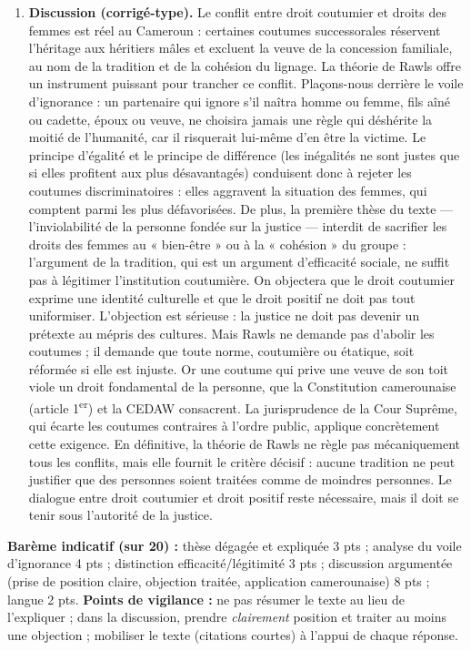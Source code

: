 \documentclass[11pt]{article}
\begin{document}
\begin{corrige}
\begin{enumerate}
\item \textbf{Discussion (corrigé-type).} Le conflit entre droit coutumier et droits des femmes est réel au Cameroun : certaines coutumes successorales réservent l'héritage aux héritiers mâles et excluent la veuve de la concession familiale, au nom de la tradition et de la cohésion du lignage. La théorie de Rawls offre un instrument puissant pour trancher ce conflit. Plaçons-nous derrière le voile d'ignorance : un partenaire qui ignore s'il naîtra homme ou femme, fils aîné ou cadette, époux ou veuve, ne choisira jamais une règle qui déshérite la moitié de l'humanité, car il risquerait lui-même d'en être la victime. Le principe d'égalité et le principe de différence (les inégalités ne sont justes que si elles profitent aux plus désavantagés) conduisent donc à rejeter les coutumes discriminatoires : elles aggravent la situation des femmes, qui comptent parmi les plus défavorisées. De plus, la première thèse du texte — l'inviolabilité de la personne fondée sur la justice — interdit de sacrifier les droits des femmes au « bien-être » ou à la « cohésion » du groupe : l'argument de la tradition, qui est un argument d'efficacité sociale, ne suffit pas à légitimer l'institution coutumière. On objectera que le droit coutumier exprime une identité culturelle et que le droit positif ne doit pas tout uniformiser. L'objection est sérieuse : la justice ne doit pas devenir un prétexte au mépris des cultures. Mais Rawls ne demande pas d'abolir les coutumes ; il demande que toute norme, coutumière ou étatique, soit réformée si elle est injuste. Or une coutume qui prive une veuve de son toit viole un droit fondamental de la personne, que la Constitution camerounaise (article 1\textsuperscript{er}) et la CEDAW consacrent. La jurisprudence de la Cour Suprême, qui écarte les coutumes contraires à l'ordre public, applique concrètement cette exigence. En définitive, la théorie de Rawls ne règle pas mécaniquement tous les conflits, mais elle fournit le critère décisif : aucune tradition ne peut justifier que des personnes soient traitées comme de moindres personnes. Le dialogue entre droit coutumier et droit positif reste nécessaire, mais il doit se tenir sous l'autorité de la justice.
\end{enumerate}
\textbf{Barème indicatif (sur 20) :} thèse dégagée et expliquée 3 pts ; analyse du voile d'ignorance 4 pts ; distinction efficacité/légitimité 3 pts ; discussion argumentée (prise de position claire, objection traitée, application camerounaise) 8 pts ; langue 2 pts.
\textbf{Points de vigilance :} ne pas résumer le texte au lieu de l'expliquer ; dans la discussion, prendre \emph{clairement} position et traiter au moins une objection ; mobiliser le texte (citations courtes) à l'appui de chaque réponse.
\end{corrige}
\end{document}
